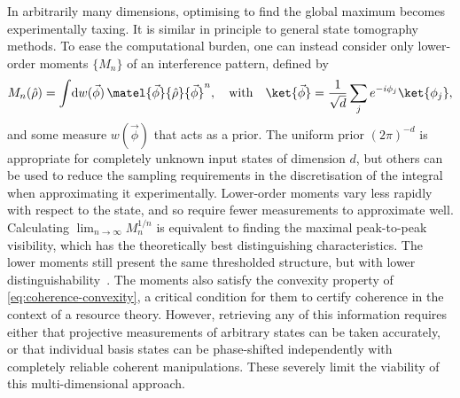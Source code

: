 In arbitrarily many dimensions, optimising to find the global maximum becomes experimentally taxing.
It is similar in principle to general state tomography methods.
To ease the computational burden, one can instead consider only lower-order moments $\{M_n\}$ of an interference pattern, defined by
\begin{equation}\label{eq:coherence-kai-moment}
M_n(\op\rho) = \int\!\mathrm dw(\vec\phi)\,{\matel{\vec\phi}{\op\rho}{\vec\phi}}^n,
\quad\text{with}\quad \ket{\vec\phi} = \frac1{\sqrt d}\sum_j e^{-i\phi_j}\ket{\phi_j},
\end{equation}
and some measure $w(\vec\phi)$ that acts as a prior.
The uniform prior ${(2\pi)}^{-d}$ is appropriate for completely unknown input states of dimension $d$, but others can be used to reduce the sampling requirements in the discretisation of the integral when approximating it experimentally.
Lower-order moments vary less rapidly with respect to the state, and so require fewer measurements to approximate well.
Calculating $\lim_{n\to\infty} M_n^{1/n}$ is equivalent to finding the maximal peak-to-peak visibility, which has the theoretically best distinguishing characteristics.
The lower moments still present the same thresholded structure, but with lower distinguishability~\cite{vonPrillwitz2015}.
The moments also satisfy the convexity property of \cref{eq:coherence-convexity}, a critical condition for them to certify coherence in the context of a resource theory.
However, retrieving any of this information requires either that projective measurements of arbitrary states can be taken accurately, or that individual basis states can be phase-shifted independently with completely reliable coherent manipulations.
These severely limit the viability of this multi-dimensional approach.

